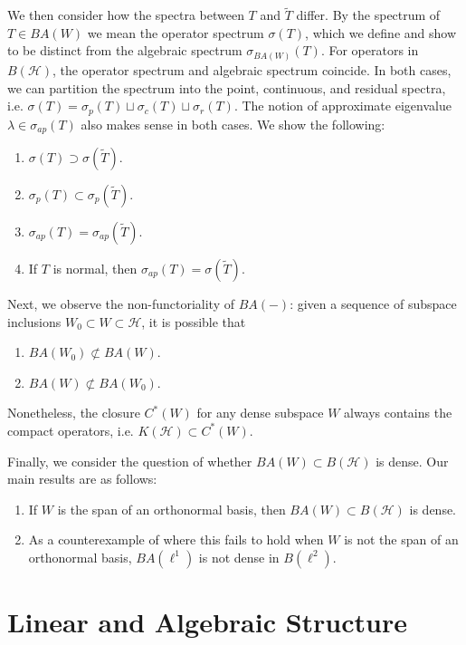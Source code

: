 \documentclass{dcthesis}
\numberwithin{equation}{section}
\numberwithin{equation}{section}
\theoremstyle{definition}
\begin{document}
We then consider how the spectra between $T$ and $\tilde{T}$ differ. By the spectrum of $T\in BA(W)$ we mean the operator spectrum $\sigma(T)$, which we define and show to be distinct from the algebraic spectrum $\sigma_{BA(W)}(T)$. For operators in $B(\mathcal{H})$, the operator spectrum and algebraic spectrum coincide. In both cases, we can partition the spectrum into the point, continuous, and residual spectra, i.e. $\sigma(T)=\sigma_p(T)\sqcup \sigma_c(T)\sqcup \sigma_r(T)$. The notion of approximate eigenvalue $\lambda\in\sigma_{ap}(T)$ also makes sense in both cases. We show the following:
\begin{enumerate}
	\item $\sigma(T)\supset\sigma(\tilde{T})$.
	\item $\sigma_p(T)\subset\sigma_p(\tilde{T})$.
	\item $\sigma_{ap}(T) = \sigma_{ap}(\tilde{T})$.
	\item If $T$ is normal, then $\sigma_{ap}(T)=\sigma(\tilde{T})$.
\end{enumerate}

Next, we observe the non-functoriality of $BA(-)$: given a sequence of subspace inclusions $W_0\subset W\subset\mathcal{H}$, it is possible that
\begin{enumerate}
	\item $BA(W_0)\not\subset BA(W)$.
	\item $BA(W)\not\subset BA(W_0)$.
\end{enumerate}
Nonetheless, the closure $C^\ast(W)$ for any dense subspace $W$ always contains the compact operators, i.e. $K(\mathcal{H})\subset C^\ast(W)$.

Finally, we consider the question of whether $BA(W)\subset B(\mathcal{H})$ is dense. Our main results are as follows:
\begin{enumerate}
	\item If $W$ is the span of an orthonormal basis, then $BA(W)\subset B(\mathcal{H})$ is dense. 
	\item As a counterexample of where this fails to hold when $W$ is not the span of an orthonormal basis, $BA(\ell^1)$ is not dense in $B(\ell^2)$.
\end{enumerate}


\chapter{Linear and Algebraic Structure}
\end{document}
